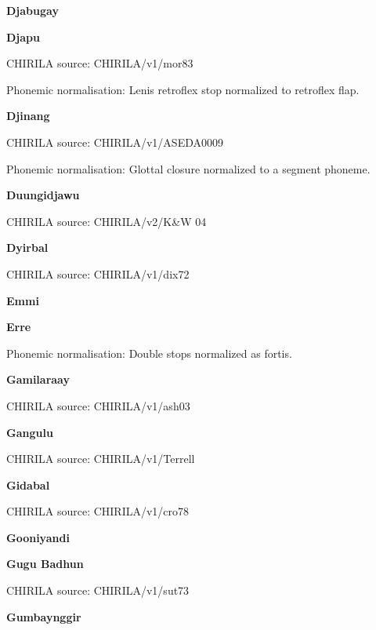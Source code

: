 \textbf{Djabugay}


\textbf{Djapu}

CHIRILA source: CHIRILA/v1/mor83


Phonemic normalisation: Lenis retroflex stop normalized to retroflex
flap.

\textbf{Djinang}

CHIRILA source: CHIRILA/v1/ASEDA0009


Phonemic normalisation: Glottal closure normalized to a segment phoneme.

\newpage


\textbf{Duungidjawu}

CHIRILA source: CHIRILA/v2/K\&W 04


\textbf{Dyirbal}

CHIRILA source: CHIRILA/v1/dix72


\textbf{Emmi}


\textbf{Erre}


Phonemic normalisation: Double stops normalized as fortis.

\textbf{Gamilaraay}

CHIRILA source: CHIRILA/v1/ash03


\textbf{Gangulu}

CHIRILA source: CHIRILA/v1/Terrell


\textbf{Gidabal}

CHIRILA source: CHIRILA/v1/cro78


\textbf{Gooniyandi}


\textbf{Gugu Badhun}

CHIRILA source: CHIRILA/v1/sut73


\textbf{Gumbaynggir}

